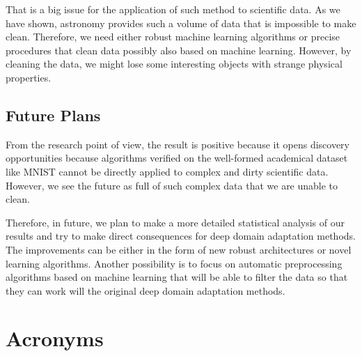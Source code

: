 \documentclass[thesis=M,english]{FITthesis}[2012/10/20]
\begin{document}
That is a big issue for the application of such method to scientific data.
As we have shown, astronomy provides such a volume of data that is impossible to make clean.
Therefore, we need either robust machine learning algorithms or precise procedures
that clean data possibly also based on machine learning.
However, by cleaning the data, we might lose some interesting objects with strange physical properties.

\section{Future Plans}

From the research point of view, the result is positive because it opens discovery opportunities because algorithms verified on the well-formed academical dataset like MNIST cannot be directly applied to complex and dirty scientific data. However, we see the future as full of such complex data that we are unable to clean.

Therefore, in future, we plan to make a more detailed statistical analysis of our results and try to make direct consequences for deep domain adaptation methods. The improvements can be either in the form of new robust architectures or novel learning algorithms. Another possibility is to focus on automatic preprocessing algorithms based on machine learning that will be able to filter the data so that they can work will the original deep domain adaptation methods.




\appendix



\chapter{Acronyms}
\end{document}
